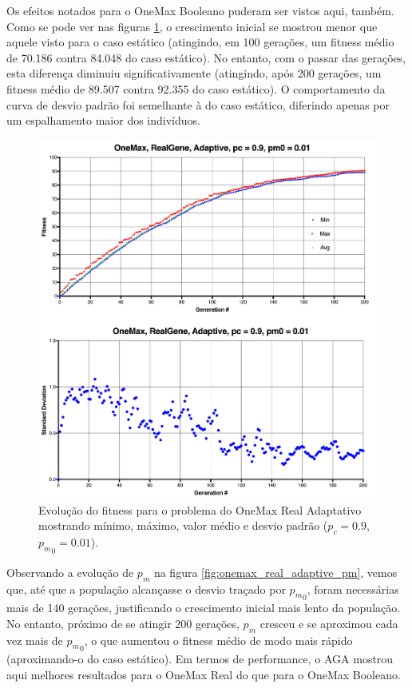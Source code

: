 Os efeitos notados para o OneMax Booleano puderam ser vistos aqui, também. Como se pode ver nas figuras \ref{fig:onemax_real_adaptive}, o crescimento inicial se mostrou menor que aquele visto para o caso estático (atingindo, em 100 gerações, um fitness médio de 70.186 contra 84.048 do caso estático). No entanto, com o passar das gerações, esta diferença diminuiu significativamente (atingindo, após 200 gerações, um fitness médio de 89.507 contra 92.355 do caso estático). O comportamento da curva de desvio padrão foi semelhante à do caso estático, diferindo apenas por um espalhamento maior dos indivíduos.

\begin{figure}[ht!]
    \centering \includegraphics[width=1.0\textwidth]{onemax_real_adaptive.jpg}
    \caption{Evolução do fitness para o problema do OneMax Real Adaptativo mostrando mínimo, máximo, valor médio e desvio padrão ($p_c=0.9$, ${p_m}_0=0.01$).}
    \label{fig:onemax_real_adaptive}
\end{figure}

Observando a evolução de $p_m$ na figura \ref{fig:onemax_real_adaptive_pm}, vemos que, até que a população alcançasse o desvio traçado por ${p_m}_0$, foram necessárias mais de 140 gerações, justificando o crescimento inicial mais lento da população. No entanto, próximo de se atingir 200 gerações, $p_m$ cresceu e se aproximou cada vez mais de ${p_m}_0$, o que aumentou o fitness médio de modo mais rápido (aproximando-o do caso estático). Em termos de performance, o AGA mostrou aqui melhores resultados para o OneMax Real do que para o OneMax Booleano.

